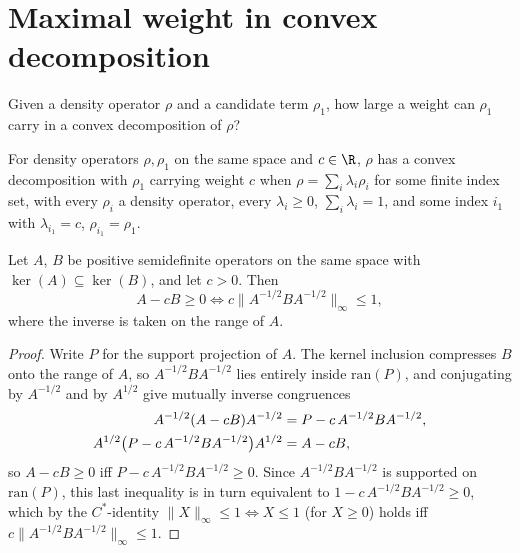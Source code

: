 \section{Maximal weight in convex decomposition}

Given a density operator $\rho$ and a candidate term $\rho_1$, how large a
weight can $\rho_1$ carry in a convex decomposition of $\rho$?

\begin{definition}
    \label{def:convex_decomposition_with}
    \leanok
    For density operators $\rho,\rho_1$ on the same space and $c\in\R$, $\rho$
    has a convex decomposition with $\rho_1$ carrying weight $c$ when
    $\rho=\sum_i\lambda_i\rho_i$ for some finite index set, with every
    $\rho_i$ a density operator, every $\lambda_i\ge0$, $\sum_i\lambda_i=1$,
    and some index $i_1$ with $\lambda_{i_1}=c$, $\rho_{i_1}=\rho_1$.
\end{definition}

\begin{lemma}
    \label{lem:sub_smul_posSemidef_iff}
    \leanok
    Let $A$, $B$ be positive semidefinite operators on the same space with
    $\ker(A)\subseteq\ker(B)$, and let $c>0$. Then
    \[
        A-cB\ge0 \iff c\bigl\|A^{-1/2}BA^{-1/2}\bigr\|_\infty\le1,
    \]
    where the inverse is taken on the range of $A$.
\end{lemma}

\begin{proof}\leanok
    Write $P$ for the support projection of $A$. The kernel inclusion
    compresses $B$ onto the range of $A$, so $A^{-1/2}BA^{-1/2}$ lies
    entirely inside $\mathrm{ran}(P)$, and conjugating by $A^{-1/2}$ and by
    $A^{1/2}$ give mutually inverse congruences
    \begin{align}
        A^{-1/2}(A-cB)A^{-1/2} &= P - c\,A^{-1/2}BA^{-1/2},
        \notag\\
        A^{1/2}\bigl(P - c\,A^{-1/2}BA^{-1/2}\bigr)A^{1/2} &= A-cB,
        \notag
    \end{align}
    so $A-cB\ge0$ iff $P-c\,A^{-1/2}BA^{-1/2}\ge0$. Since
    $A^{-1/2}BA^{-1/2}$ is supported on $\mathrm{ran}(P)$, this last
    inequality is in turn equivalent to $1-c\,A^{-1/2}BA^{-1/2}\ge0$, which
    by the $C^*$-identity $\|X\|_\infty\le1\iff X\le1$ (for $X\ge0$) holds
    iff $c\|A^{-1/2}BA^{-1/2}\|_\infty\le1$.
\end{proof}

